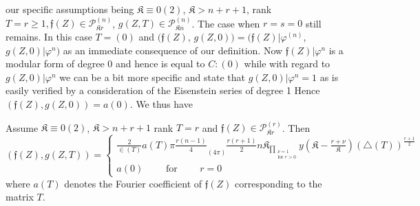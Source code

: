   \noindent
  our specific assumptions being $\mathfrak{K} \equiv 0(2)$,
  $\mathfrak{K}> n+r+1$, rank $T=r 
  \geq 1, \mathfrak{f}(Z)\in \mathscr{P}_{\mathfrak{K}r}^{(n)}$, $g(Z, T)\in
  \mathscr{P}_{\mathfrak{K} 
    n}^{(n)}$. The case when $r=s=0$ still remains. In this case
  $T=(0)$ and $(\mathfrak{f}(Z)$, $g(Z,
  0))=(\mathfrak{f}(Z)|\varphi^{(n)}$, $g(Z, 0)|\varphi^n)$ as an
  immediate consequence of our definition. Now
  $\mathfrak{f}(Z)|\varphi^n$ is a modular form of degree 0 and hence
  is equal to $C:(0)$ while with regard to $g(Z, 0)| \varphi^n$ we can
  be a bit more specific and state that $g(Z, 0)|\varphi^n=1$ as is
  easily verified by a consideration of the Eisenstein\pageoriginale
  series of degree 1 Hence $(\mathfrak{f}(Z), g(Z, 0))=a(0)$. We
  thus have  


   \begin{thm}\label{chap11:thm15}%
  Assume $\mathfrak{K} \equiv 0(2)$, $\mathfrak{K}>n+r+1$  rank $T=r$ 
    and 
  $\mathfrak{f}(Z)\in \mathscr{P}_{\mathfrak{K} r}^{(r)}$. Then 
{\fontsize{10pt}{12pt}\selectfont
$$
(\mathfrak{f}(Z), g(Z, T)) = \begin{cases}
\frac{2}{\in(T)} a(T)\pi \frac{r(n-1)}{4}\underset{(4
  \pi)}{}\frac{r(r+1)}{2}n\mathfrak{K}_{\prod\limits_{\substack{\nu=1 \\ \text{
        for }  r>0}}}y (\mathfrak{K}-\frac{r+
  \nu}{\mathfrak{K}})(\triangle(T))^{\frac{r+1}{2}}\\a(0) \qquad
\text{ for }  \qquad  r=0 
\end{cases}
$$}\relax
where $a(T)$ denotes the Fourier coefficient of
  $\mathfrak{f}(Z)$ corresponding to the matrix $T$. 
   \end{thm}

